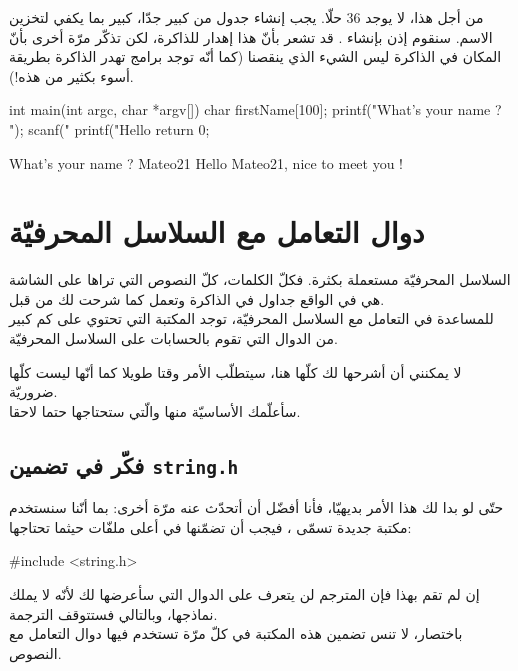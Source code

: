 من أجل هذا، لا يوجد 36 حلّا. يجب إنشاء جدول من
كبير جدّا، كبير بما يكفي لتخزين الاسم. سنقوم إذن بإنشاء
.
قد تشعر بأنّ هذا إهدار للذاكرة، لكن تذكّر مرّة أخرى بأنّ المكان في الذاكرة ليس الشيء الذي ينقصنا
(كما أنّه توجد برامج تهدر الذاكرة بطريقة أسوء بكثير من هذه!).

\begin{Csource}
int main(int argc, char *argv[])
{
	char firstName[100];
	printf("What's your name ? ");
	scanf("%
	printf("Hello %
	return 0;
}
\end{Csource}

\begin{Console}
What's your name ? Mateo21
Hello Mateo21, nice to meet you !
\end{Console}

\section{دوال التعامل مع السلاسل المحرفيّة}

السلاسل المحرفيّة مستعملة بكثرة. فكلّ الكلمات، كلّ النصوص التي تراها على الشاشة هي في الواقع جداول
في الذاكرة وتعمل كما شرحت لك من قبل.\\
للمساعدة في التعامل مع السلاسل المحرفيّة، توجد المكتبة
التي تحتوي على كم كبير من الدوال التي تقوم بالحسابات على السلاسل المحرفيّة.

لا يمكنني أن أشرحها لك كلّها هنا، سيتطلّب الأمر وقتا طويلا كما أنّها ليست كلّها ضروريّة.\\
سأعلّمك الأساسيّة منها والّتي ستحتاجها حتما لاحقا.

\subsection{فكّر في تضمين \texttt{string.h}}

حتّى لو بدا لك هذا الأمر بديهيّا، فأنا أفضّل أن أتحدّث عنه مرّة أخرى: بما أنّنا سنستخدم مكتبة جديدة تسمّى
،
فيجب أن تضمّنها في أعلى ملفّات
حيثما تحتاجها:

\begin{Csource}
#include <string.h>
\end{Csource}

إن لم تقم بهذا فإن المترجم لن يتعرف على الدوال التي سأعرضها لك لأنّه لا يملك نماذجها، وبالتالي فستتوقف الترجمة.\\
باختصار، لا تنس تضمين هذه المكتبة في كلّ مرّة تستخدم فيها دوال التعامل مع النصوص.

